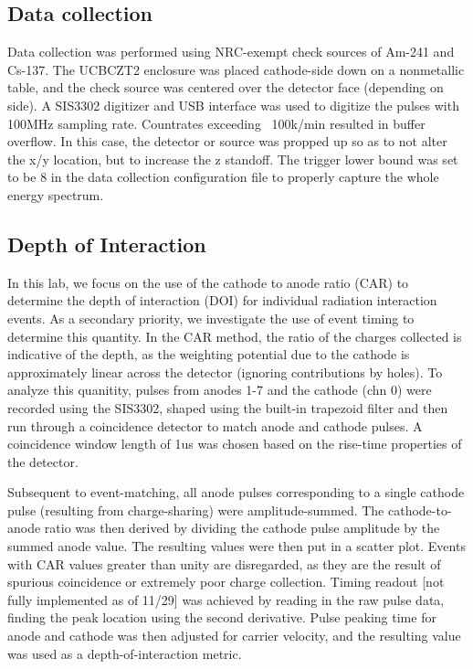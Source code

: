 \subsection{Data collection}
Data collection was performed using NRC-exempt check sources of Am-241 and Cs-137. The UCBCZT2 enclosure was placed cathode-side down on a nonmetallic table, and the check source was centered over the detector face (depending on side). A SIS3302 digitizer and USB interface was used to digitize the pulses with 100MHz sampling rate. Countrates exceeding ~100k/min resulted in buffer overflow. In this case, the detector or source was propped up so as to not alter the x/y location, but to increase the z standoff. The trigger lower bound was set to be 8 in the data collection configuration file to properly capture the whole energy spectrum. 

\subsection{Depth of Interaction}
In this lab, we focus on the use of the cathode to anode ratio (CAR) to determine the depth of interaction (DOI) for individual radiation interaction events. As a secondary priority, we investigate the use of event timing to determine this quantity. In the CAR method, the ratio of the charges collected is indicative of the depth, as the weighting potential due to the cathode is approximately linear across the detector (ignoring contributions by holes). To analyze this quanitity, pulses from anodes 1-7 and the cathode (chn 0) were recorded using the SIS3302, shaped using the built-in trapezoid filter and then run through a coincidence detector to match anode and cathode pulses. A coincidence window length of 1us was chosen based on the rise-time properties of the detector.

Subsequent to event-matching, all anode pulses corresponding to a single cathode pulse (resulting from charge-sharing) were amplitude-summed. The cathode-to-anode ratio was then derived by dividing the cathode pulse amplitude by the summed anode value. The resulting values were then put in a scatter plot. Events with CAR values greater than unity are disregarded, as they are the result of spurious coincidence or extremely poor charge collection. Timing readout [not fully implemented as of 11/29] was achieved by reading in the raw pulse data, finding the peak location using the second derivative. Pulse peaking time for anode and cathode was then adjusted for carrier velocity, and the resulting value was used as a depth-of-interaction metric.

